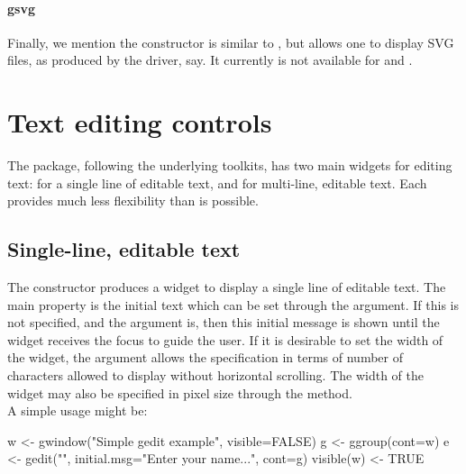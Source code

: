 \paragraph{gsvg}
Finally, we mention the  constructor is similar to
, but allows one to display SVG files, as produced
by the  driver, say. It currently is not available for
 and .


\section{Text editing controls}
\label{sec:gWidgets-text-edit-contr}
The  package, following the underlying toolkits, has two
main widgets for editing text:  for a single line
of editable text, and  for multi-line, editable
text. Each provides much less flexibility than is possible.



\subsection{Single-line, editable text}
\label{sec:gWidgets-single-line-editable}


The  constructor produces a widget to display a
single line of editable text. The main property is the initial text
which can be set through the  argument.  If this
is not specified, and the argument  is,
then this initial message is shown until the widget receives the focus
to guide the user.  If it is desirable to set the width of the widget,
the  argument allows the specification in terms
of number of characters allowed to display without horizontal
scrolling. The width of the widget may also be specified in pixel size
through the  method.
\\

A simple usage might be:
\begin{Schunk}
\begin{Sinput}
 w <- gwindow("Simple gedit example", visible=FALSE)
 g <- ggroup(cont=w)
 e <- gedit("", initial.msg="Enter your name...", cont=g)
 visible(w) <- TRUE
\end{Sinput}
\end{Schunk}



